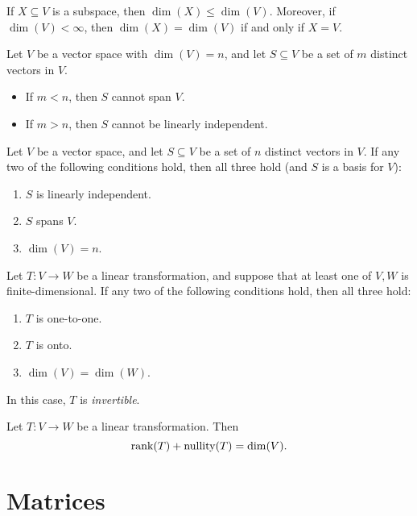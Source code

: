 \begin{fact}
	If $X \subseteq V$ is a subspace, then $\dim(X) \leq \dim(V)$.  Moreover, if
	$\dim(V) < \infty$, then $\dim(X) = \dim(V)$ if and only if $X = V$.
\end{fact}

\begin{fact}
	Let $V$ be a vector space with $\dim(V) = n$, and let $S \subseteq V$ be a set
	of $m$ distinct vectors in $V$.
	\begin{itemize}
		\item If $m < n$, then $S$ cannot span $V$.
		\item If $m > n$, then $S$ cannot be linearly independent.
	\end{itemize}
\end{fact}

\begin{theorem}
	Let $V$ be a vector space, and let $S \subseteq V$ be a set of $n$ distinct
	vectors in $V$. If any two of the following conditions hold, then all three
	hold (and $S$ is a basis for $V$):
	\begin{enumerate}
		\item $S$ is linearly independent.
		\item $S$ spans $V$.
		\item $\dim(V) = n$.
	\end{enumerate}
\end{theorem}

\begin{theorem}
	Let $T : V \rightarrow W$ be a linear transformation, and suppose that at
	least one of $V, W$ is finite-dimensional. If any two of the following
	conditions hold, then all three hold:
	\begin{enumerate}
		\item $T$ is one-to-one.
		\item $T$ is onto.
		\item $\dim(V) = \dim(W)$.
	\end{enumerate}
	In this case, $T$ is \emph{invertible}.
\end{theorem}

\begin{theorem}
	Let $T : V \rightarrow W$ be a linear transformation. Then
	\[
		\text{rank}(T) + \text{nullity}(T) = \dim(V).
	\]
\end{theorem}

\section*{Matrices}

